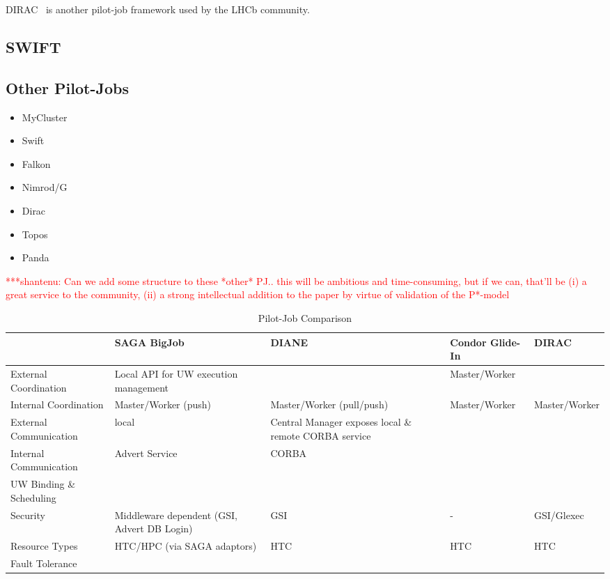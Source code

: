\documentclass[conference,final]{IEEEtran}
\newcommand{\jhanote}[1]{ {\textcolor{red} { ***shantenu: #1 }}}
\newcommand{\jhanote}[1]{}
\begin{document}
DIRAC~\cite{1742-6596-219-6-062049} is another pilot-job framework used by the 
LHCb community.

\subsection{SWIFT}

\subsection{Other Pilot-Jobs}

\begin{itemize}
    \item MyCluster
    \item Swift
    \item Falkon
    \item Nimrod/G
    \item Dirac
    \item Topos
    \item Panda    
\end{itemize}

\jhanote{Can we add some structure to these *other* PJ.. this will be
  ambitious and time-consuming, but if we can, that'll be (i) a great
  service to the community, (ii) a strong intellectual addition to the
  paper by virtue of validation of the P*-model}


\begin{table}[t]
\centering
\begin{tabular}{|l|p{2.5cm}|p{2.5cm}|p{2.5cm}|p{2.5cm}|}
	\hline
	&\textbf{SAGA BigJob} &\textbf{DIANE} &\textbf{Condor Glide-In} &   
	\textbf{DIRAC} \\ \hline
External Coordination &Local API for UW execution management & &Master/Worker &\\ \hline

Internal Coordination &Master/Worker (push) &Master/Worker (pull/push) &Master/Worker &Master/Worker\\ \hline

External Communication &local &Central Manager exposes local \& remote CORBA service & &\\ \hline
	
Internal Communication &Advert Service &CORBA & & \\ \hline

UW Binding \& Scheduling &&&&\\ \hline

Security &Middleware dependent (GSI, Advert DB Login) &GSI &- &GSI/Glexec\\ \hline

Resource Types &HTC/HPC (via SAGA adaptors) &HTC &HTC &HTC \\ \hline

Fault Tolerance  &&&&\\ \hline
	
\end{tabular}
\caption{Pilot-Job Comparison}
\end{table}
\end{document}
